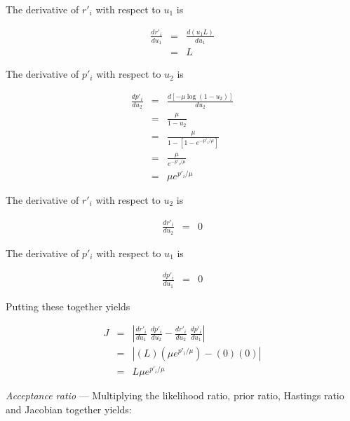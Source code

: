 \documentclass[12pt]{article}
\newcommand{\newprobmean}{\mu}
\begin{document}
The derivative of $r'_i$ with respect to $u_1$ is

\begin{eqnarray*}
\frac{d r'_i}{d u_1} & = & \frac{d (u_1 L)}{d u_1} \\
& = & L
\end{eqnarray*}

The derivative of $p'_i$ with respect to $u_2$ is

\begin{eqnarray*}
\frac{d p'_i}{d u_2} & = & \frac{d \left[ -\newprobmean \log(1 - u_2) \right]}{d u_2} \\
& = & \frac{\newprobmean}{1 - u_2} \\
& = & \frac{\newprobmean}{1 - \left[ 1 - e^{-p'_i/\newprobmean} \right]} \\
& = & \frac{\newprobmean}{e^{-p'_i/\newprobmean}} \\
& = & \newprobmean e^{p'_i/\newprobmean}
\end{eqnarray*}

The derivative of $r'_i$ with respect to $u_2$ is 

\begin{eqnarray*}
\frac{d r'_i}{d u_2} & = & 0
\end{eqnarray*}

The derivative of $p'_i$ with respect to $u_1$ is

\begin{eqnarray*}
\frac{d p'_i}{d u_1} & = & 0
\end{eqnarray*}

Putting these together yields

\begin{eqnarray*}
J & = & \left| \frac{d r'_i}{d u_1} \; \frac{d p'_i}{d u_2} - \frac{d r'_i}{d u_2} \; \frac{d p'_i}{d u_1} \right| \\
& = & \left| \left( L \right) \left( \newprobmean e^{p'_i/\newprobmean} \right) - \left( 0 \right) \left( 0 \right) \right| \\
& = & L \newprobmean e^{p'_i/\newprobmean}
\end{eqnarray*}

{\em Acceptance ratio} --- Multiplying the likelihood ratio, prior ratio, Hastings ratio and Jacobian together yields:
\end{document}
